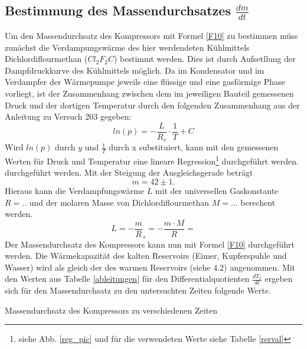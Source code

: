 \documentclass[11pt]{article}
\begin{document}
\subsection{Bestimmung des Massendurchsatzes $\frac{dm}{dt}$}
Um den Massendurchsatz des Kompressors mit Formel \ref{F10} zu bestimmen müss zunächst die Verdampungswärme des hier werdendeten Kühlmittels Dichlordiflourmethan ($Cl_2F_2C$) bestimmt werden. Dies ist durch Aufsetllung der Dampfdruckkurve des Kühlmittels möglich. Da im Kondensator und im Verdampfer der Wärmepumpe jeweils eine flüssige und eine gasförmige Phase vorliegt, ist der Zusammenhang zwischen dem im jeweiligen Bauteil gemessenen Druck und der dortigen Temperatur durch den folgenden Zusammenhang aus der Anleitung zu Versuch 203 gegeben:
\begin{equation}
ln(p)= - \frac{L}{R_s} \cdot \frac{1}{T} + C
\end{equation}
Wird $ln(p)$ durch $y$ und $\frac1T$ durch x substituiert, kann mit den gemessenen Werten für Druck und Temperatur eine lineare Regression\footnote{siehe Abb. \ref{reg_pic} und  für die verwendeten Werte siehe Tabelle \ref{rerval} } durchgeführt werden. durchgeführt werden. Mit der Steigung der Ausgleichsgerade beträgt
\[m = 42 \pm 1 .\]
Hieraus kann die Verdampfungswärme $L$ mit der universellen Gaskonstante $R=..$ und der molaren Masse von Dichlordiflourmethan $M = ...$ berechent werden.
\begin{equation}
L = -\frac mR_s = -\frac {m \cdot M}{R} =
\end{equation}
Der Massendurchsatz des Kompressors kann nun mit Formel \ref{F10} durchgeführt werden. Die Wärmekapazität des kalten Reservoirs (Eimer, Kupferspuhle und Wasser) wird als gleich der des warmen Reservoirs (siehe 4.2) angenommen. Mit den Werten aus Tabelle \ref{ableitungen} für den Differentialquotienten $\frac{dT_2}{dt}$ ergeben sich für den Massendurchsatz zu den untersuchten Zeiten folgende Werte.
\begin{table}

\caption{Massendurchsatz des Kompressors zu verschiedenen Zeiten}
\end{table}
\end{document}
